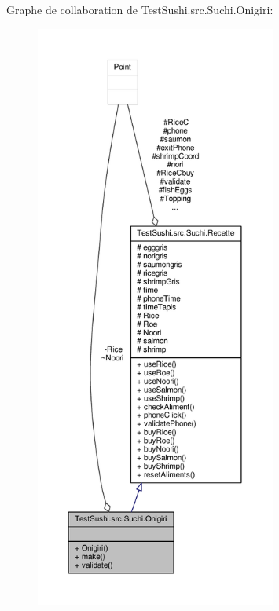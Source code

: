 Graphe de collaboration de Test\+Sushi.\+src.\+Suchi.\+Onigiri\+:\nopagebreak
\begin{figure}[H]
\begin{center}
\leavevmode
\includegraphics[height=550pt]{classTestSushi_1_1src_1_1Suchi_1_1Onigiri__coll__graph}
\end{center}
\end{figure}
